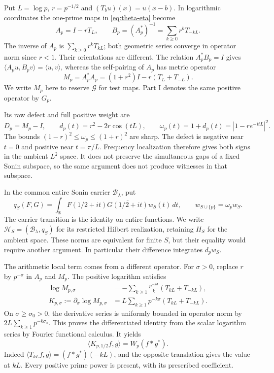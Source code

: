 \documentclass[11pt,letterpaper]{article}
\theoremstyle{definition}
\theoremstyle{remark}
\newcommand{\R}{\mathbb R}
\newcommand{\Bcal}{\mathcal B}
\begin{document}
Put $L=\log p$, $r=p^{-1/2}$ and $(T_bu)(x)=u(x-b)$. In logarithmic
coordinates the one-prime maps in \eqref{eq:theta-eta} become
\begin{equation}
 A_p=I-rT_L,\qquad B_p=(A_p^*)^{-1}
                  =\sum_{k\ge0}r^kT_{-kL}.
 \label{eq:operators}
\end{equation}
The inverse of $A_p$ is $\sum_{k\ge0}r^kT_{kL}$; both geometric
series converge in operator norm since $r<1$. Their orientations
are different. The relation $A_p^*B_p=I$ gives
$\langle A_pu,B_pv\rangle=\langle u,v\rangle$, whereas
the self-pairing of $A_p$ has metric operator
\begin{equation}
 M_p=A_p^*A_p=(1+r^2)I-r(T_L+T_{-L}).
 \label{eq:metric}
\end{equation}
We write $M_p$ here to reserve $\mathcal G$ for test maps.
Part I denotes the same positive operator by $G_p$.

Its raw defect and full positive weight are
\begin{equation}
 D_p=M_p-I,\qquad d_p(t)=r^2-2r\cos(tL),\qquad
 \omega_p(t)=1+d_p(t)=|1-re^{-itL}|^2.
 \label{eq:defect-weight}
\end{equation}
The bounds $(1-r)^2\le\omega_p\le(1+r)^2$ are sharp.
The defect is negative near $t=0$ and positive near $t=\pi/L$.
Frequency localization therefore gives both signs in the ambient
$L^2$ space. It does not preserve the simultaneous gaps of a fixed
Sonin subspace, so the same argument does not produce witnesses in
that subspace.

In the common entire Sonin carrier $\Bcal_\lambda$, put
\begin{equation}
 q_S(F,G)=\int_\R F(1/2+it)\overline{G(1/2+it)}w_S(t)\,dt,\qquad
 w_{S\cup\{p\}}=\omega_pw_S.
 \label{eq:carrier}
\end{equation}
The carrier transition is the identity on entire functions. We write
$\mathcal H_S=(\Bcal_\lambda,q_S)$ for its restricted Hilbert
realization, retaining $H_S$ for the ambient space. These norms are
equivalent for finite $S$, but their equality would require another
argument. In particular their difference integrates $d_pw_S$.

The arithmetic local term comes from a different operator. For
$\sigma>0$, replace $r$ by $p^{-\sigma}$ in $A_p$ and $M_p$.
The positive logarithm satisfies
\begin{align}
 \log M_{p,\sigma}
 &=-\sum_{k\ge1}\frac{p^{-k\sigma}}k(T_{kL}+T_{-kL}),\label{eq:log}\\
 K_{p,\sigma}:=\partial_\sigma\log M_{p,\sigma}
 &=L\sum_{k\ge1}p^{-k\sigma}(T_{kL}+T_{-kL}).\label{eq:K}
\end{align}
On $\sigma\ge\sigma_0>0$, the derivative series is uniformly
bounded in operator norm by $2L\sum_{k\ge1}p^{-k\sigma_0}$.
This proves the differentiated identity from the scalar logarithm
series by Fourier functional calculus. It yields
\begin{equation}
 \langle K_{p,1/2}f,g\rangle=W_p(f*g^*).
 \label{eq:K-Weil}
\end{equation}
Indeed $\langle T_{kL}f,g\rangle=(f*g^*)(-kL)$, and the opposite
translation gives the value at $kL$. Every positive prime power is
present, with its prescribed coefficient.
\end{document}
